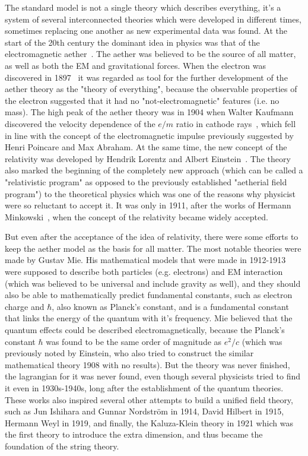 The standard model is not a single theory which describes everything, it's a system of several interconnected theories which were developed in different times, sometimes replacing one another as new experimental data was found. At the start of the 20th century the dominant idea in physics was that of the electromagnetic aether~\cite{lib:theory_EM1, lib:theory_EM2, lib:theory_EM3}. The aether was believed to be the source of all matter, as well as both the EM and gravitational forces. When the electron was discovered in 1897~\cite{lib:theory_electron} it was regarded as tool for the further development of the aether theory as the "theory of everything", because the observable properties of the electron suggested that it had no "not-electromagnetic" features (i.e. no mass). The high peak of the aether theory was in 1904 when Walter Kaufmann discovered the velocity dependence of the $e/m$ ratio in cathode rays~\cite{lib:theory_e_m1, lib:theory_e_m2}, which fell in line with the concept of the electromagnetic impulse previously suggested by Henri Poincare and Max Abraham. At the same time, the new concept of the relativity was developed by Hendrik Lorentz and Albert Einstein~\cite{lib:theory_relat}. The theory also marked the beginning of the completely new approach (which can be called a "relativistic program" as opposed to the previously established "aetherial field program") to the theoretical physics which was one of the reasons why physicist were so reluctant to accept it. It was only in 1911, after the works of Hermann Minkowski~\cite{lib:theory_minkowski1, lib:theory_minkowski2}, when the concept of the relativity became widely accepted.

But even after the acceptance of the idea of relativity, there were some efforts to keep the aether model as the basis for all matter. The most notable theories were made by Gustav Mie. His mathematical models that were made in 1912-1913 were supposed to describe both particles (e.g. electrons) and EM interaction (which was believed to be universal and include gravity as well), and they should also be able to mathematically predict fundamental constants, such as electron charge and $\hbar$, also known as Planck's constant, and is a fundamental constant that links the energy of the quantum with it's frequency. Mie believed that the quantum effects could be described electromagnetically, because the Planck's constant $\hbar$ was found to be the same order of magnitude as $e^{2}/c$ (which was previously noted by Einstein, who also tried to construct the similar mathematical theory 1908 with no results). But the theory was never finished, the lagrangian for it was never found, even though several physicists tried to find it even in 1930s-1940s, long after the establishment of the quantum theories. These works also inspired several other attempts to build a unified field theory, such as Jun Ishihara and Gunnar Nordstr{\"o}m in 1914, David Hilbert in 1915, Hermann Weyl in 1919, and finally, the Kaluza-Klein theory in 1921 which was the first theory to introduce the extra dimension, and thus became the foundation of the string theory.

